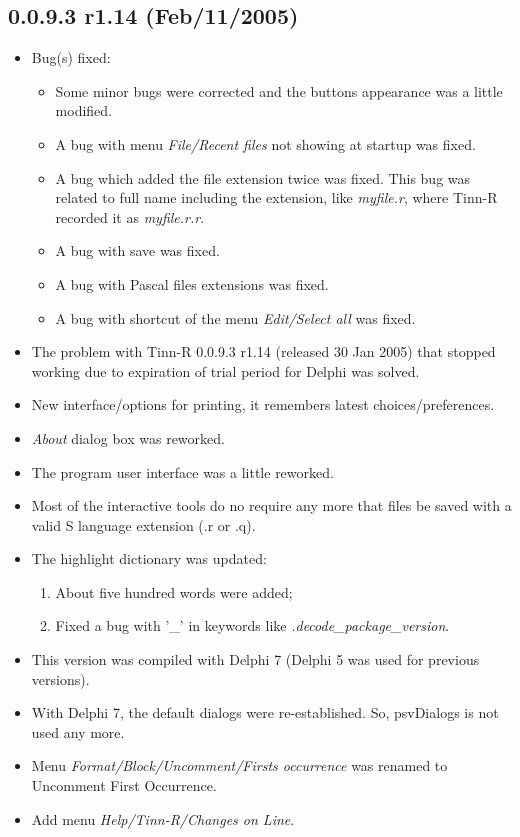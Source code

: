 \subsection{0.0.9.3 r1.14 (Feb/11/2005)}
\begin{itemize}
  \item Bug(s) fixed:
    \begin{itemize}
      \item Some minor bugs were corrected and the buttons appearance was a little modified.
      \item A bug with menu \textit{File/Recent files} not showing at startup was fixed.
      \item A bug which added the file extension twice was fixed.
        This bug was related to full name including the extension, like \textit{myfile.r}, 
        where Tinn-R recorded it as \textit{myfile.r.r}.
      \item A bug with save was fixed.
      \item A bug with Pascal files extensions was fixed.
      \item A bug with shortcut of the menu \textit{Edit/Select all} was fixed.
    \end{itemize}
  \item The problem with Tinn-R 0.0.9.3 r1.14 (released 30 Jan 2005) that stopped working due to expiration of 
    trial period for Delphi was solved.
  \item New interface/options for printing, it remembers latest choices/preferences.
  \item \textit{About} dialog box was reworked.
  \item The program user interface was a little reworked.
  \item Most of the interactive \RR{} tools do no require any more that files be saved with a valid 
    S language extension (.r or .q).
  \item The \RR{} highlight dictionary was updated:
    \begin{enumerate}
      \item About five hundred words were added;
      \item Fixed a bug with '\_' in keywords like \textit{.decode\_package\_version}.
    \end{enumerate}
  \item This version was compiled with Delphi 7 (Delphi 5 was used for previous versions).
  \item With Delphi 7, the default dialogs were re-established. So, psvDialogs is not used any more.
  \item Menu \textit{Format/Block/Uncomment/Firsts occurrence} was renamed to Uncomment First Occurrence.
  \item Add menu \textit{Help/Tinn-R/Changes on Line}.
\end{itemize}
